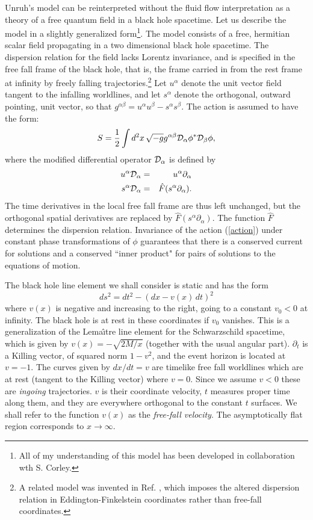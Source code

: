 \documentclass[12pt]{article}
\begin{document}
Unruh's model can be reinterpreted without the fluid flow
interpretation as a theory of a free quantum field in a black hole
spacetime. Let us describe the model in a slightly generalized
form\footnote{All of my understanding of this model has been developed
in collaboration wth S. Corley.}\cite{Jaco-mex,CorlJaco}.  The model
consists of a free, hermitian scalar field propagating in a two
dimensional black hole spacetime. The dispersion relation for the field
lacks Lorentz invariance, and is specified in the free fall frame of
the black hole, that is, the frame carried in from the rest frame at
infinity by freely falling trajectories.\footnote{A related model was
invented in Ref. \cite{BMPS}, which imposes the altered dispersion
relation in Eddington-Finkelstein coordinates rather than free-fall
coordinates.} Let $u^\alpha$ denote the unit vector field tangent to
the infalling worldlines, and let $s^\alpha$ denote the orthogonal,
outward pointing, unit vector, so that $g^{\alpha\beta}=u^\alpha
u^\beta-s^\alpha s^\beta$.  The action is assumed to have the form:
\begin{equation}
S={1\over2}\int d^2x \, \sqrt{-g} g^{\alpha\beta} {\cal D}_\alpha\phi^* {\cal D}_\beta\phi,
\label{action}
\end{equation}
where the modified differential operator ${\cal D}_\alpha$ is defined by
\begin{eqnarray}
u^\alpha {\cal D}_\alpha &=& u^\alpha \partial_\alpha\\
s^\alpha {\cal D}_\alpha &= &\hat{F}(s^\alpha \partial_\alpha).
\end{eqnarray}
The time derivatives in the local free fall frame are thus left
unchanged, but the orthogonal spatial derivatives are replaced by
$\hat{F}(s^\alpha \partial_\alpha)$.  The function $\hat{F}$ determines
the dispersion relation.  Invariance of the action (\ref{action}) under
constant phase transformations of $\phi$ guarantees that there is a
conserved current for solutions and a conserved ``inner product" for
pairs of solutions to the equations of motion.

The black hole line element we shall consider is static and has the
form 
\begin{equation} 
ds^2=dt^2-(dx-v(x)\, dt)^2 
\end{equation} where
$v(x)$ is negative and increasing to the right, going to a constant
$v_0<0$ at infinity. The black hole is at rest in these coordinates if
$v_0$ vanishes.  This is a generalization of the Lema\^{\i}tre line
element for the Schwarzschild spacetime, which is given by
$v(x)=-\sqrt{2M/x}$ (together with the usual angular part).
$\partial_t$ is a Killing vector, of squared norm $1-v^2$, and the
event horizon is located at $v=-1$.  The curves given by $dx/dt=v$ are
timelike free fall worldlines which are at rest (tangent to the Killing
vector) where $v=0$.  Since we assume $v<0$ these are {\it ingoing}
trajectories.  $v$ is their coordinate velocity, $t$ measures proper
time along them, and they are everywhere orthogonal to the constant $t$
surfaces.  We shall refer to the function $v(x)$ as the {\it free-fall
velocity}.  The asymptotically flat region corresponds to
$x\rightarrow\infty$.
\end{document}
